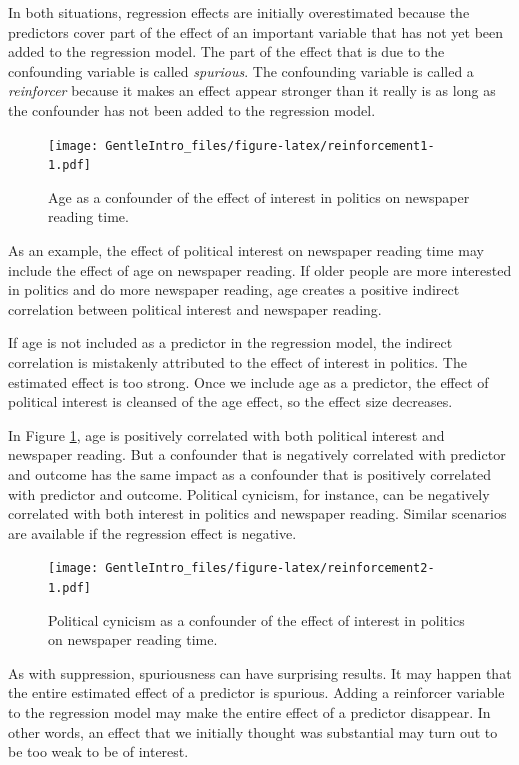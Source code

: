 \documentclass[a4paper]{book}
\theoremstyle{definition}
\theoremstyle{definition}
\theoremstyle{definition}
\theoremstyle{remark}
\begin{document}
In both situations, regression effects are initially overestimated
because the predictors cover part of the effect of an important variable
that has not yet been added to the regression model. The part of the
effect that is due to the confounding variable is called
\emph{spurious}. The confounding variable is called a \emph{reinforcer}
because it makes an effect appear stronger than it really is as long as
the confounder has not been added to the regression model.

\begin{figure}
\centering
\texttt{[image: GentleIntro\_files/figure-latex/reinforcement1-1.pdf]}
\caption{\label{fig:reinforcement1}Age as a confounder of the effect of
interest in politics on newspaper reading time.}
\end{figure}

As an example, the effect of political interest on newspaper reading
time may include the effect of age on newspaper reading. If older people
are more interested in politics and do more newspaper reading, age
creates a positive indirect correlation between political interest and
newspaper reading.

If age is not included as a predictor in the regression model, the
indirect correlation is mistakenly attributed to the effect of interest
in politics. The estimated effect is too strong. Once we include age as
a predictor, the effect of political interest is cleansed of the age
effect, so the effect size decreases.

In Figure \ref{fig:reinforcement1}, age is positively correlated with
both political interest and newspaper reading. But a confounder that is
negatively correlated with predictor and outcome has the same impact as
a confounder that is positively correlated with predictor and outcome.
Political cynicism, for instance, can be negatively correlated with both
interest in politics and newspaper reading. Similar scenarios are
available if the regression effect is negative.

\begin{figure}
\centering
\texttt{[image: GentleIntro\_files/figure-latex/reinforcement2-1.pdf]}
\caption{\label{fig:reinforcement2}Political cynicism as a confounder of the
effect of interest in politics on newspaper reading time.}
\end{figure}

As with suppression, spuriousness can have surprising results. It may
happen that the entire estimated effect of a predictor is spurious.
Adding a reinforcer variable to the regression model may make the entire
effect of a predictor disappear. In other words, an effect that we
initially thought was substantial may turn out to be too weak to be of
interest.
\end{document}
